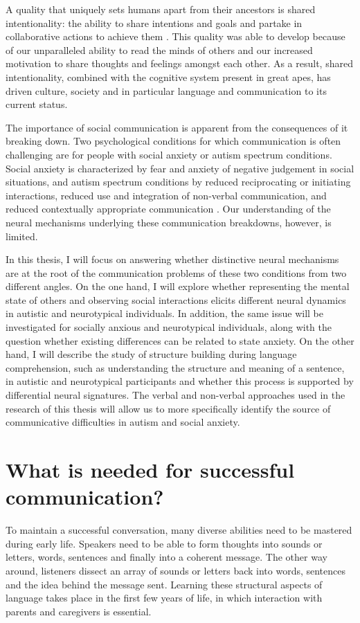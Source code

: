 A quality that uniquely sets humans apart from their ancestors is shared intentionality: the ability to share intentions and goals and partake in collaborative actions to achieve them \citep{tomasello2005}. This quality was able to develop because of our unparalleled ability to read the minds of others and our increased motivation to share thoughts and feelings amongst each other. As a result, shared intentionality, combined with the cognitive system present in great apes, has driven culture, society and in particular language and communication to its current status. 

The importance of social communication is apparent from the consequences of it breaking down. Two psychological conditions for which communication is often challenging are for people with social anxiety or autism spectrum conditions. Social anxiety is characterized by fear and anxiety of negative judgement in social situations, and autism spectrum conditions by reduced reciprocating or initiating interactions, reduced use and integration of non-verbal communication, and reduced contextually appropriate communication \citep{apa2013}. Our understanding of the neural mechanisms underlying these communication breakdowns, however, is limited. 

In this thesis, I will focus on answering whether distinctive neural mechanisms are at the root of the communication problems of these two conditions from two different angles. On the one hand, I will explore whether representing the mental state of others and observing social interactions elicits different neural dynamics in autistic and neurotypical individuals. In addition, the same issue will be investigated for socially anxious and neurotypical individuals, along with the question whether existing differences can be related to state anxiety. On the other hand, I will describe the study of structure building during language comprehension, such as understanding the structure and meaning of a sentence, in autistic and neurotypical participants and whether this process is supported by differential neural signatures. The verbal and non-verbal approaches used in the research of this thesis will allow us to more specifically identify the source of communicative difficulties in autism and social anxiety. 

\section*{What is needed for successful communication?}
To maintain a successful conversation, many diverse abilities need to be mastered during early life. Speakers need to be able to form thoughts into sounds or letters, words, sentences and finally into a coherent message. The other way around, listeners dissect an array of sounds or letters back into words, sentences and the idea behind the message sent. Learning these structural aspects of language takes place in the first few years of life, in which interaction with parents and caregivers is essential. 

